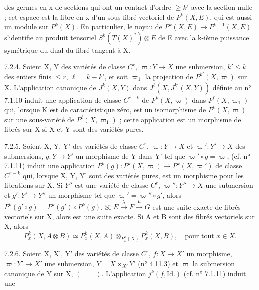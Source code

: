 des germes en x de sections qui ont un contact d'ordre $\geq k'$ avec la section nulle ; cet espace est la fibre en x d'un sous-fibré vectoriel de $P^k(X,E)$, qui est aussi un module sur $P^k(X)$. En particulier, le noyau de $P^k(X,E)\longrightarrow P^{k-1}(X,E)$ s'identifie au produit tensoriel $S^k(T(X)^*)\otimes E$ de E avec la k-ième puissance symétrique du dual du fibré tangent à X.

7.2.4. Soient X, Y des variétés de classe $C^r$, $\varpi:Y\longrightarrow X$ une submersion, $k'\leq k$ des entiers finis $\leq r$, $\ell=k-k'$, et soit $\varpi_1$ la projection de $P^{k'}(X,\varpi)$ sur X. L'application canonique de $J^k(X,Y)$ dans $J^\ell(X,J^{k'}(X,Y))$ définie au n° 7.1.10 induit une application de classe $C^{r-k}$ de $P^k(X,\varpi)$ dans $P^\ell(X,\varpi_1)$ qui, lorsque K est de caractéristique zéro, est un isomorphisme de $P^k(X,\varpi)$ sur une sous-variété de $P^\ell(X,\varpi_1)$ ; cette application est un morphisme de fibrés sur X si X et Y sont des variétés pures.

7.2.5. Soient X, Y, Y' des variétés de classe $C^r$, $\varpi:Y\longrightarrow X$ et $\varpi':Y'\longrightarrow X$ des submersions, $g:Y\longrightarrow Y'$ un morphisme de Y dans Y' tel que $\varpi'\circ g=\varpi$,  (cf. n° 7.1.11) induit une application $P^k(g):P^k(X,\varpi)\longrightarrow P^k(X,\varpi')$ de classe $C^{r-k}$ qui, lorsque X, Y, Y' sont des variétés pures, est un morphisme pour les fibrations sur X. Si $Y''$ est une variété de classe $C^r$, $\varpi'':Y''\longrightarrow X$ une submersion et $g':Y'\longrightarrow Y''$ un morphisme tel que $\varpi'=\varpi''\circ g'$, alors $P^k(g'\circ g)=P^k(g')\circ P^k(g)$. Si $E\xrightarrow{\lambda}F\xrightarrow{\mu}G$ est une suite exacte de fibrés vectoriels sur X, alors
est une suite exacte. Si A et B sont des fibrés vectoriels sur X, alors
\[
P_x^k(X,A\otimes B)\simeq P_x^k(X,A)\otimes_{P_x^k(X)}P_x^k(X,B),\quad\text{pour tout }x\in X.
\]

7.2.6. Soient X, X', Y' des variétés de classe $C^r$, $f:X\longrightarrow X'$ un morphisme, $\varpi:Y'\longrightarrow X'$ une submersion, $Y=X\times_{X'}Y'$ (n° 4.11.3) et $\varpi$ la submersion canonique de Y sur X, $(\qquad)$. L'application $j^k(f,\mathrm{Id}.)$ (cf. n° 7.1.11) induit une

